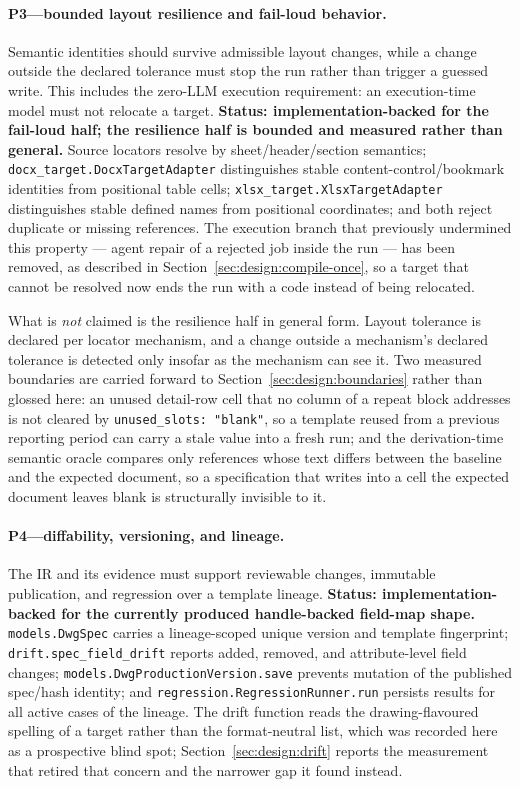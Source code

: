\paragraph{P3---bounded layout resilience and fail-loud behavior.}
Semantic identities should survive admissible layout changes, while a change outside
the declared tolerance must stop the run rather than trigger a guessed write. This
includes the zero-LLM execution requirement: an execution-time model must not relocate a
target. \textbf{Status: implementation-backed for the fail-loud half; the resilience
half is bounded and measured rather than general.} Source locators resolve by
sheet/header/section semantics; \texttt{docx\_target.DocxTargetAdapter} distinguishes
stable content-control/bookmark identities from positional table cells;
\texttt{xlsx\_target.XlsxTargetAdapter} distinguishes stable defined names from
positional coordinates; and both reject duplicate or missing references. The execution
branch that previously undermined this property --- agent repair of a rejected job
inside the run --- has been removed, as described in
Section~\ref{sec:design:compile-once}, so a target that cannot be resolved now ends the
run with a code instead of being relocated.

What is \emph{not} claimed is the resilience half in general form. Layout tolerance is
declared per locator mechanism, and a change outside a mechanism's declared tolerance is
detected only insofar as the mechanism can see it. Two measured boundaries are carried
forward to Section~\ref{sec:design:boundaries} rather than glossed here: an unused
detail-row cell that no column of a repeat block addresses is not cleared by
\texttt{unused\_slots: "blank"}, so a template reused from a previous reporting period
can carry a stale value into a fresh run; and the derivation-time semantic oracle
compares only references whose text differs between the baseline and the expected
document, so a specification that writes into a cell the expected document leaves blank
is structurally invisible to it.
\paragraph{P4---diffability, versioning, and lineage.}
The IR and its evidence must support reviewable changes, immutable publication, and
regression over a template lineage. \textbf{Status: implementation-backed for the
currently produced handle-backed field-map shape.}
\texttt{models.DwgSpec} carries a lineage-scoped unique version and template fingerprint;
\texttt{drift.spec\_field\_drift} reports added, removed, and attribute-level field
changes; \texttt{models.DwgProductionVersion.save} prevents mutation of the published
spec/hash identity; and \texttt{regression.RegressionRunner.run} persists results for
all active cases of the lineage. The drift function reads the drawing-flavoured spelling of
a target rather than the format-neutral list, which was recorded here as a prospective
blind spot; Section~\ref{sec:design:drift} reports the measurement that retired that
concern and the narrower gap it found instead.

